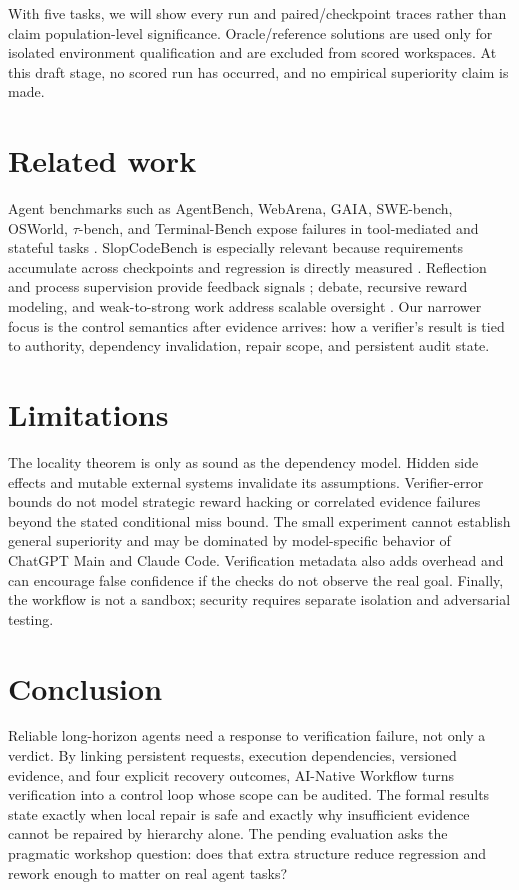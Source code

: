 \documentclass{article}
\begin{document}
With five tasks, we will show every run and paired/checkpoint traces rather than claim population-level significance. Oracle/reference solutions are used only for isolated environment qualification and are excluded from scored workspaces. At this draft stage, no scored run has occurred, and no empirical superiority claim is made.

\section{Related work}
Agent benchmarks such as AgentBench, WebArena, GAIA, SWE-bench, OSWorld, $\tau$-bench, and Terminal-Bench expose failures in tool-mediated and stateful tasks \citep{liu2024agentbench,zhou2024webarena,mialon2024gaia,jimenez2024swebench,xie2024osworld,yao2024taubench,merrill2026terminalbench}. SlopCodeBench is especially relevant because requirements accumulate across checkpoints and regression is directly measured \citep{orlanski2026slopcodebench}. Reflection and process supervision provide feedback signals \citep{shinn2023reflexion,lightman2023verify}; debate, recursive reward modeling, and weak-to-strong work address scalable oversight \citep{irving2018debate,leike2018recursive,burns2024weakstrong}. Our narrower focus is the control semantics after evidence arrives: how a verifier's result is tied to authority, dependency invalidation, repair scope, and persistent audit state.

\section{Limitations}
The locality theorem is only as sound as the dependency model. Hidden side effects and mutable external systems invalidate its assumptions. Verifier-error bounds do not model strategic reward hacking or correlated evidence failures beyond the stated conditional miss bound. The small experiment cannot establish general superiority and may be dominated by model-specific behavior of ChatGPT Main and Claude Code. Verification metadata also adds overhead and can encourage false confidence if the checks do not observe the real goal. Finally, the workflow is not a sandbox; security requires separate isolation and adversarial testing.

\section{Conclusion}
Reliable long-horizon agents need a response to verification failure, not only a verdict. By linking persistent requests, execution dependencies, versioned evidence, and four explicit recovery outcomes, AI-Native Workflow turns verification into a control loop whose scope can be audited. The formal results state exactly when local repair is safe and exactly why insufficient evidence cannot be repaired by hierarchy alone. The pending evaluation asks the pragmatic workshop question: does that extra structure reduce regression and rework enough to matter on real agent tasks?



\end{document}
